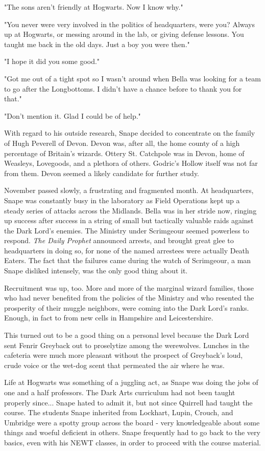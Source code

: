 \documentclass[a4paper,11pt]{article}
\begin{document}
"The sons aren't friendly at Hogwarts. Now I know why."

"You never were very involved in the politics of headquarters, were you? Always up at Hogwarts, or messing around in the lab, or giving defense lessons. You taught me back in the old days. Just a boy you were then."

"I hope it did you some good."

"Got me out of a tight spot so I wasn't around when Bella was looking for a team to go after the Longbottoms. I didn't have a chance before to thank you for that."

"Don't mention it. Glad I could be of help."

With regard to his outside research, Snape decided to concentrate on the family of Hugh Peverell of Devon. Devon was, after all, the home county of a high percentage of Britain's wizards. Ottery St. Catchpole was in Devon, home of Weasleys, Lovegoods, and a plethora of others. Godric's Hollow itself was not far from them. Devon seemed a likely candidate for further study.

November passed slowly, a frustrating and fragmented month. At headquarters, Snape was constantly busy in the laboratory as Field Operations kept up a steady series of attacks across the Midlands. Bella was in her stride now, ringing up success after success in a string of small but tactically valuable raids against the Dark Lord's enemies. The Ministry under Scrimgeour seemed powerless to respond. \emph{The Daily Prophet} announced arrests, and brought great glee to headquarters in doing so, for none of the named arrestees were actually Death Eaters. The fact that the failures came during the watch of Scrimgeour, a man Snape disliked intensely, was the only good thing about it.

Recruitment was up, too. More and more of the marginal wizard families, those who had never benefited from the policies of the Ministry and who resented the prosperity of their muggle neighbors, were coming into the Dark Lord's ranks. Enough, in fact to from new cells in Hampshire and Leicestershire.

This turned out to be a good thing on a personal level because the Dark Lord sent Fenrir Greyback out to proselytize among the werewolves. Lunches in the cafeteria were much more pleasant without the prospect of Greyback's loud, crude voice or the wet-dog scent that permeated the air where he was.

Life at Hogwarts was something of a juggling act, as Snape was doing the jobs of one and a half professors. The Dark Arts curriculum had not been taught properly since... Snape hated to admit it, but not since Quirrell had taught the course. The students Snape inherited from Lockhart, Lupin, Crouch, and Umbridge were a spotty group across the board - very knowledgeable about some things and woeful deficient in others. Snape frequently had to go back to the very basics, even with his NEWT classes, in order to proceed with the course material.
\end{document}
